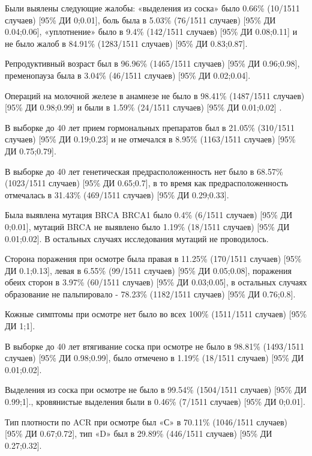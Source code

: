 \documentclass[
]{article}
\begin{document}
Были выялены следующие жалобы: «выделения из соска» было 0.66\% (10/1511
случаев) {[}95\% ДИ 0;0.01{]}, боль была в 5.03\% (76/1511 случаев)
{[}95\% ДИ 0.04;0.06{]}, «уплотнение» было в 9.4\% (142/1511 случаев)
{[}95\% ДИ 0.08;0.11{]} и не было жалоб в 84.91\% (1283/1511 случаев)
{[}95\% ДИ 0.83;0.87{]}.

Репродуктивный возраст был в 96.96\% (1465/1511 случаев) {[}95\% ДИ
0.96;0.98{]}, пременопауза была в 3.04\% (46/1511 случаев) {[}95\% ДИ
0.02;0.04{]}.

Операций на молочной железе в анамнезе не было в 98.41\% (1487/1511
случаев) {[}95\% ДИ 0.98;0.99{]} и были в 1.59\% (24/1511 случаев)
{[}95\% ДИ 0.01;0.02{]} .

В выборке до 40 лет прием гормональных препаратов был в 21.05\%
(310/1511 случаев) {[}95\% ДИ 0.19;0.23{]} и не отмечался в 8.95\%
(1163/1511 случаев) {[}95\% ДИ 0.75;0.79{]}.

В выборке до 40 лет генетическая предрасположенность нет было в 68.57\%
(1023/1511 случаев) {[}95\% ДИ 0.65;0.7{]}, в то время как
предрасположенность отмечалась в 31.43\% (469/1511 случаев) {[}95\% ДИ
0.29;0.33{]}.

Была выявлена мутация BRCA BRCA1 было 0.4\% (6/1511 случаев) {[}95\% ДИ
0;0.01{]}, мутаций BRCA не выявлено было 1.19\% (18/1511 случаев)
{[}95\% ДИ 0.01;0.02{]}. В остальных случаях исследования мутаций не
проводилось.

Сторона поражения при осмотре была правая в 11.25\% (170/1511 случаев)
{[}95\% ДИ 0.1;0.13{]}, левая в 6.55\% (99/1511 случаев) {[}95\% ДИ
0.05;0.08{]}, поражения обеих сторон в 3.97\% (60/1511 случаев) {[}95\%
ДИ 0.03;0.05{]}, в остальных случаях образование не пальпировало -
78.23\% (1182/1511 случаев) {[}95\% ДИ 0.76;0.8{]}.

Кожные симптомы при осмотре нет было во всех 100\% (1511/1511 случаев)
{[}95\% ДИ 1;1{]}.

В выборке до 40 лет втягивание соска при осмотре не было в 98.81\%
(1493/1511 случаев) {[}95\% ДИ 0.98;0.99{]}, было отмечено в 1.19\%
(18/1511 случаев) {[}95\% ДИ 0.01;0.02{]}.

Выделения из соска при осмотре не было в 99.54\% (1504/1511 случаев)
{[}95\% ДИ 0.99;1{]}., кровянистые выделения были в 0.46\% (7/1511
случаев) {[}95\% ДИ 0;0.01{]}.

Тип плотности по ACR при осмотре был «С» в 70.11\% (1046/1511 случаев)
{[}95\% ДИ 0.67;0.72{]}, тип «D» был в 29.89\% (446/1511 случаев)
{[}95\% ДИ 0.27;0.32{]}.
\end{document}
